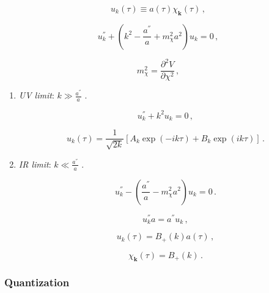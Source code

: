 \begin{equation}
u_k(\tau) \equiv a(\tau) \chi_{\mathbf{k}}(\tau) \,,
\label{equation:3.2.8}
\end{equation}

\begin{equation}
u_k^{''} + \left ( k^2 - \frac{a^{''}}{a} + m_{\chi}^2 a^2 \right ) u_k = 0 \, ,
\label{equation:3.2.9}
\end{equation}

\begin{equation}
m_{\chi}^2 = \dfrac{\partial^2 V}{\partial \chi^2} \, ,
\label{equation:3.2.10}
\end{equation}
  
\begin{enumerate}
\item \textit{UV limit}:  $ \mathit{k\gg \frac{a^{''}}{a}} $ . 

\begin{equation}
u_k^{''} +  k^2 u_k = 0 \, ,
\label{equation:3.2.11}
\end{equation}

\begin{equation}
u_k(\tau) = \frac{1}{\sqrt{2k}}\left[ A_k \exp(-ik\tau) + B_k \exp(ik\tau) \right] \, .
\label{equation:3.2.12}
\end{equation}


\item \textit{IR limit}: $ \mathit{k\ll \frac{a^{''}}{a}} $ . 

\begin{equation}
u_k^{''} - \left ( \frac{a^{''}}{a} - m_{\chi}^2 a^2 \right ) u_k = 0 \, .
\label{equation:3.2.13}
\end{equation}

\begin{equation}
u_k^{''} a = a^{''} u_k \, ,
\label{equation:3.2.14}
\end{equation}

\begin{equation}
u_k(\tau) = B_{+} (k) a(\tau) \, ,
\label{equation:3.2.15}
\end{equation}

\begin{equation}
\chi_{\mathbf{k}}(\tau) = B_{+} (k) \, .
\label{equation:3.2.16} 
\end{equation}

\end{enumerate}

\subsubsection{Quantization}
\label{subsubsection:3.2.1}



